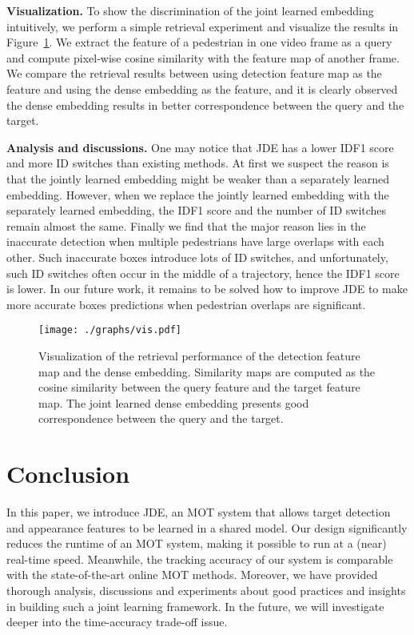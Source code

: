 \documentclass[runningheads]{llncs}
\begin{document}
\textbf{Visualization.} To show the discrimination of the joint learned embedding intuitively, we perform a simple retrieval experiment and visualize the results in Figure~\ref{fig:vis}. We extract the feature of a pedestrian in one video frame as a query and compute pixel-wise cosine similarity with the feature map of another frame. We compare the retrieval results between using detection feature map as the feature and using the dense embedding as the feature, and it is clearly observed the dense embedding results in better correspondence between the query and the target.


\textbf{Analysis and discussions.} One may notice that JDE has a lower IDF1 score and more ID switches than existing methods. At first we suspect the reason is that the jointly learned embedding might be weaker than a separately learned embedding. However, when we replace the jointly learned embedding with the separately learned embedding, the IDF1 score and the number of ID switches remain almost the same. Finally we find that the major reason lies in the inaccurate detection when multiple pedestrians have large overlaps with each other.  Such inaccurate boxes introduce lots of ID switches, and unfortunately, such ID switches often occur in the middle of a trajectory, hence the IDF1 score is lower. In our future work, it remains to be solved how to improve JDE to make more accurate boxes predictions when pedestrian overlaps are significant. \begin{figure}[t]
    \centering
    \texttt{[image: ./graphs/vis.pdf]}
    \caption{Visualization of the retrieval performance of the detection feature map and the dense embedding. Similarity maps are computed as the cosine similarity between the query feature and the target feature map. The joint learned dense embedding presents good correspondence between the  query and the target.}
    \label{fig:vis}
    
\end{figure}




\section{Conclusion}
In this paper, we introduce JDE, an MOT system that allows target detection and appearance features to be learned in a shared model. Our design significantly reduces the runtime of an MOT system, making it possible to run at a (near) real-time speed. Meanwhile, the tracking accuracy of our system is comparable with the state-of-the-art online MOT methods. Moreover, we have provided thorough analysis, discussions and experiments about good practices and insights in building such a joint learning framework. In the future, we will investigate deeper into the time-accuracy trade-off issue.

\clearpage


\end{document}
